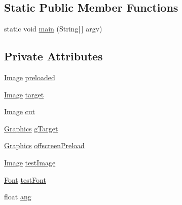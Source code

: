 \subsection*{Static Public Member Functions}
\begin{DoxyCompactItemize}
\item 
static void \mbox{\hyperlink{classorg_1_1newdawn_1_1slick_1_1tests_1_1_image_graphics_test_a4ed20df4f9a7280a98bade0cfc7b6171}{main}} (String\mbox{[}$\,$\mbox{]} argv)
\end{DoxyCompactItemize}
\subsection*{Private Attributes}
\begin{DoxyCompactItemize}
\item 
\mbox{\hyperlink{classorg_1_1newdawn_1_1slick_1_1_image}{Image}} \mbox{\hyperlink{classorg_1_1newdawn_1_1slick_1_1tests_1_1_image_graphics_test_a60866f2682da296b8acce663a9234490}{preloaded}}
\item 
\mbox{\hyperlink{classorg_1_1newdawn_1_1slick_1_1_image}{Image}} \mbox{\hyperlink{classorg_1_1newdawn_1_1slick_1_1tests_1_1_image_graphics_test_a888e3ae78c68bb5306e1ed1ca431eed8}{target}}
\item 
\mbox{\hyperlink{classorg_1_1newdawn_1_1slick_1_1_image}{Image}} \mbox{\hyperlink{classorg_1_1newdawn_1_1slick_1_1tests_1_1_image_graphics_test_a2fa20a20e1c0e9f83c27c498e2cb8b23}{cut}}
\item 
\mbox{\hyperlink{classorg_1_1newdawn_1_1slick_1_1_graphics}{Graphics}} \mbox{\hyperlink{classorg_1_1newdawn_1_1slick_1_1tests_1_1_image_graphics_test_a8e0f77fa89b99985f4f4f3840f984339}{g\+Target}}
\item 
\mbox{\hyperlink{classorg_1_1newdawn_1_1slick_1_1_graphics}{Graphics}} \mbox{\hyperlink{classorg_1_1newdawn_1_1slick_1_1tests_1_1_image_graphics_test_a74912917d74353833cbe845e80cfb3a4}{offscreen\+Preload}}
\item 
\mbox{\hyperlink{classorg_1_1newdawn_1_1slick_1_1_image}{Image}} \mbox{\hyperlink{classorg_1_1newdawn_1_1slick_1_1tests_1_1_image_graphics_test_aa5fcd83d179c3a7b4846a88021eae28a}{test\+Image}}
\item 
\mbox{\hyperlink{interfaceorg_1_1newdawn_1_1slick_1_1_font}{Font}} \mbox{\hyperlink{classorg_1_1newdawn_1_1slick_1_1tests_1_1_image_graphics_test_a04a732c5d9b41939f587c32ab97d73b9}{test\+Font}}
\item 
float \mbox{\hyperlink{classorg_1_1newdawn_1_1slick_1_1tests_1_1_image_graphics_test_a79ae7333596817e631221f89db724a9c}{ang}}
\end{DoxyCompactItemize}
